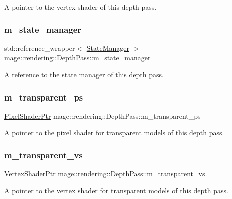 A pointer to the vertex shader of this depth pass. \hypertarget{classmage_1_1rendering_1_1_depth_pass_a86c299c8b6ec689c83c60451fd988a35}{}\label{classmage_1_1rendering_1_1_depth_pass_a86c299c8b6ec689c83c60451fd988a35} 
\subsubsection{\texorpdfstring{m\+\_\+state\+\_\+manager}{m\_state\_manager}}
{\footnotesize\ttfamily std\+::reference\+\_\+wrapper$<$ \hyperlink{classmage_1_1rendering_1_1_state_manager}{State\+Manager} $>$ mage\+::rendering\+::\+Depth\+Pass\+::m\+\_\+state\+\_\+manager\hspace{0.3cm}{\ttfamily [private]}}

A reference to the state manager of this depth pass. \hypertarget{classmage_1_1rendering_1_1_depth_pass_a6ef4d5064ab4cb485ae77cb230f90c6a}{}\label{classmage_1_1rendering_1_1_depth_pass_a6ef4d5064ab4cb485ae77cb230f90c6a} 
\subsubsection{\texorpdfstring{m\+\_\+transparent\+\_\+ps}{m\_transparent\_ps}}
{\footnotesize\ttfamily \hyperlink{namespacemage_1_1rendering_af03d922b228ee9c8542baaa2ecc9f259}{Pixel\+Shader\+Ptr} mage\+::rendering\+::\+Depth\+Pass\+::m\+\_\+transparent\+\_\+ps\hspace{0.3cm}{\ttfamily [private]}}

A pointer to the pixel shader for transparent models of this depth pass. \hypertarget{classmage_1_1rendering_1_1_depth_pass_ab505e6b33ab449c2b7914d93e728eabb}{}\label{classmage_1_1rendering_1_1_depth_pass_ab505e6b33ab449c2b7914d93e728eabb} 
\subsubsection{\texorpdfstring{m\+\_\+transparent\+\_\+vs}{m\_transparent\_vs}}
{\footnotesize\ttfamily \hyperlink{namespacemage_1_1rendering_aaf704b9c54a4181f4950a1761de69dda}{Vertex\+Shader\+Ptr} mage\+::rendering\+::\+Depth\+Pass\+::m\+\_\+transparent\+\_\+vs\hspace{0.3cm}{\ttfamily [private]}}

A pointer to the vertex shader for transparent models of this depth pass. 
